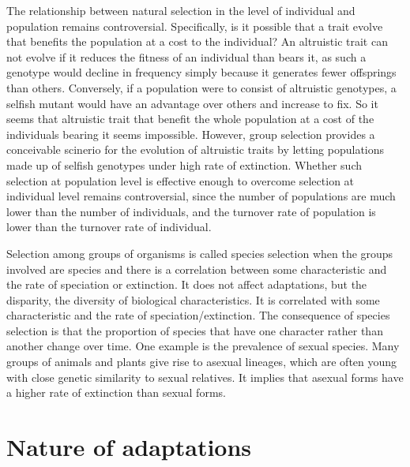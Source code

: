 \documentclass[11pt]{article}
\begin{document}
\begin{sloppypar}
The relationship between natural selection in the level of individual and population remains controversial. 
Specifically, is it possible that a trait evolve that benefits the population at a cost to the individual? 
An altruistic trait can not evolve if it reduces the fitness of an individual than bears it, as such a genotype would decline in frequency simply because it generates fewer offsprings than others. 
Conversely, if a population were to consist of altruistic genotypes, a selfish mutant would have an advantage over others and increase to fix. 
So it seems that altruistic trait that benefit the whole population at a cost of the individuals bearing it seems impossible. 
However, group selection provides a conceivable scinerio for the evolution of altruistic traits by letting populations made up of selfish genotypes under high rate of extinction. 
Whether such selection at population level is effective enough to overcome selection at individual level remains controversial, since the number of populations are much lower than the number of individuals, and the turnover rate of population is lower than the turnover rate of individual. 

\par

Selection among groups of organisms is called species selection when the groups involved are species and there is a correlation between some characteristic and the rate of speciation or extinction. 
It does not affect adaptations, but the disparity, the diversity of biological characteristics. 
It is correlated with some characteristic and the rate of speciation/extinction. 
The consequence of species selection is that the proportion of species that have one character rather than another change over time. 
One example is the prevalence of sexual species. 
Many groups of animals and plants give rise to asexual lineages, which are often young with close genetic similarity to sexual relatives. 
It implies that asexual forms have a higher rate of extinction than sexual forms. 

\section{Nature of adaptations}

\end{sloppypar}
\end{document}
